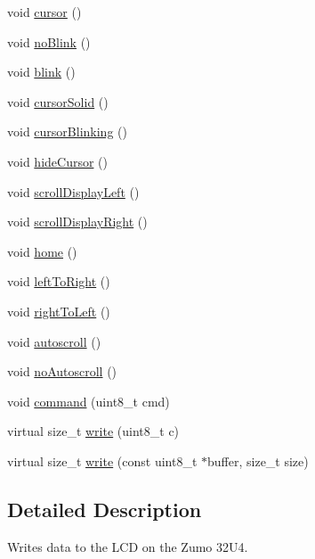 \begin{DoxyCompactItemize}
void \hyperlink{class_pololu_h_d44780_base_a4fd53028d74561be579103d674aa8eab}{cursor} ()
\item 
void \hyperlink{class_pololu_h_d44780_base_a301afc921881052b166e11cd45ad9696}{no\+Blink} ()
\item 
void \hyperlink{class_pololu_h_d44780_base_ac6e255adf32d5c70c0163422b1ae8e0c}{blink} ()
\item 
void \hyperlink{class_pololu_h_d44780_base_a6a4d8e79beda9f7c81659a8e13c8c338}{cursor\+Solid} ()
\item 
void \hyperlink{class_pololu_h_d44780_base_a6a53a6cffbb77953b5a2c4ae49e288de}{cursor\+Blinking} ()
\item 
void \hyperlink{class_pololu_h_d44780_base_a1db083d254d251c479a577f29bcdcec8}{hide\+Cursor} ()
\item 
void \hyperlink{class_pololu_h_d44780_base_aada34a47663585f60b70e1d6f936f6d3}{scroll\+Display\+Left} ()
\item 
void \hyperlink{class_pololu_h_d44780_base_a411512707f303af75de3c5aea313bf48}{scroll\+Display\+Right} ()
\item 
void \hyperlink{class_pololu_h_d44780_base_ab2d24add3c6da0328055bceb38a6d42c}{home} ()
\item 
void \hyperlink{class_pololu_h_d44780_base_ada551bdb01681eb57bec325778eb38a6}{left\+To\+Right} ()
\item 
void \hyperlink{class_pololu_h_d44780_base_aa3f8d4ba18feb9aa0f0a2fef3c6c2b37}{right\+To\+Left} ()
\item 
void \hyperlink{class_pololu_h_d44780_base_ad5104d9651fd95704d1ae192073b0d61}{autoscroll} ()
\item 
void \hyperlink{class_pololu_h_d44780_base_aee80e23d270913dd2c353e7bd5408249}{no\+Autoscroll} ()
\item 
void \hyperlink{class_pololu_h_d44780_base_a449ad8d9ff7afb90667da0003a39af3b}{command} (uint8\+\_\+t cmd)
\item 
virtual size\+\_\+t \hyperlink{class_pololu_h_d44780_base_a1aad3b3ce5820dc910174b3c91a5d65e}{write} (uint8\+\_\+t c)
\item 
virtual size\+\_\+t \hyperlink{class_pololu_h_d44780_base_a965028ffd2313e9eaa968348effcab81}{write} (const uint8\+\_\+t $\ast$buffer, size\+\_\+t size)
\end{DoxyCompactItemize}


\subsection{Detailed Description}
Writes data to the L\+CD on the Zumo 32\+U4. 

